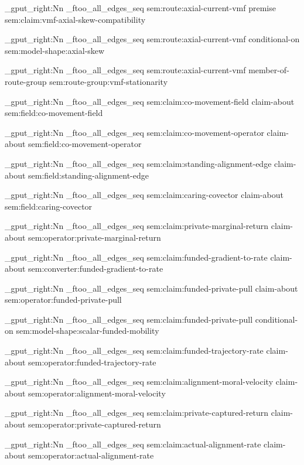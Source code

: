 \seq_gput_right:Nn \g_ftoo_all_edges_seq { { sem:route:axial-current-vmf } { premise } { sem:claim:vmf-axial-skew-compatibility } }

\seq_gput_right:Nn \g_ftoo_all_edges_seq { { sem:route:axial-current-vmf } { conditional-on } { sem:model-shape:axial-skew } }

\seq_gput_right:Nn \g_ftoo_all_edges_seq { { sem:route:axial-current-vmf } { member-of-route-group } { sem:route-group:vmf-stationarity } }

\seq_gput_right:Nn \g_ftoo_all_edges_seq { { sem:claim:co-movement-field } { claim-about } { sem:field:co-movement-field } }

\seq_gput_right:Nn \g_ftoo_all_edges_seq { { sem:claim:co-movement-operator } { claim-about } { sem:field:co-movement-operator } }

\seq_gput_right:Nn \g_ftoo_all_edges_seq { { sem:claim:standing-alignment-edge } { claim-about } { sem:field:standing-alignment-edge } }

\seq_gput_right:Nn \g_ftoo_all_edges_seq { { sem:claim:caring-covector } { claim-about } { sem:field:caring-covector } }

\seq_gput_right:Nn \g_ftoo_all_edges_seq { { sem:claim:private-marginal-return } { claim-about } { sem:operator:private-marginal-return } }

\seq_gput_right:Nn \g_ftoo_all_edges_seq { { sem:claim:funded-gradient-to-rate } { claim-about } { sem:converter:funded-gradient-to-rate } }

\seq_gput_right:Nn \g_ftoo_all_edges_seq { { sem:claim:funded-private-pull } { claim-about } { sem:operator:funded-private-pull } }

\seq_gput_right:Nn \g_ftoo_all_edges_seq { { sem:claim:funded-private-pull } { conditional-on } { sem:model-shape:scalar-funded-mobility } }

\seq_gput_right:Nn \g_ftoo_all_edges_seq { { sem:claim:funded-trajectory-rate } { claim-about } { sem:operator:funded-trajectory-rate } }

\seq_gput_right:Nn \g_ftoo_all_edges_seq { { sem:claim:alignment-moral-velocity } { claim-about } { sem:operator:alignment-moral-velocity } }

\seq_gput_right:Nn \g_ftoo_all_edges_seq { { sem:claim:private-captured-return } { claim-about } { sem:operator:private-captured-return } }

\seq_gput_right:Nn \g_ftoo_all_edges_seq { { sem:claim:actual-alignment-rate } { claim-about } { sem:operator:actual-alignment-rate } }


